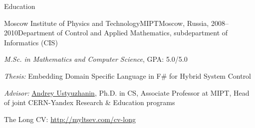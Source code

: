 \documentclass{resume} %
\newif\iflongversion
\begin{document}
\begin{rSection}{Education}

\begin{rSubsectionEducation}{Moscow Institute of Physics and Technology}{MIPT}{Moscow,
Russia, 2008--2010}{Department of Control and Applied Mathematics, 
subdepartment of Informatics (CIS)}
\item \textit{M.Sc. in Mathematics and Computer Science}, GPA: 5.0/5.0
\item \textit{Thesis:} Embedding Domain Specific Language in F\# for Hybrid System Control
\item \textit{Advisor:} \href{https://ru.linkedin.com/in/andreyustyuzhanin}{Andrey Ustyuzhanin},
Ph.D. in CS, Associate Professor at MIPT, Head of joint CERN-Yandex Research \& Education programs
\end{rSubsectionEducation}

\iflongversion
\else
The Long CV: {\href{http://myltsev.com/cv-long}{http://myltsev.com/cv-long}}

\end{rSection}
\fi
\end{document}
